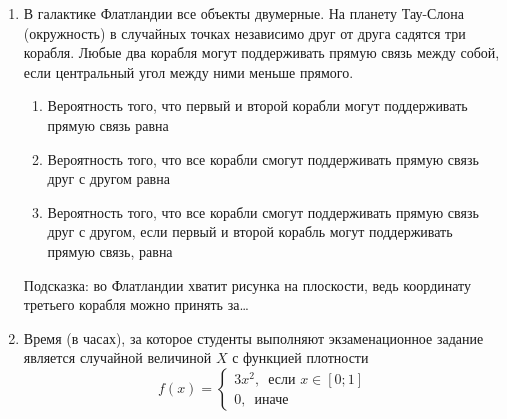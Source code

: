 \begin{enumerate}

\item В галактике Флатландии все объекты двумерные. На планету Тау-Слона (окружность) в случайных точках независимо друг от друга садятся три корабля. Любые два корабля могут поддерживать прямую связь между собой, если центральный угол между ними меньше прямого.

\begin{enumerate}
\item Вероятность того, что первый и второй корабли могут поддерживать прямую связь равна \underline{\hspace{2cm}}
\item Вероятность того, что все корабли смогут поддерживать прямую связь друг с другом равна \underline{\hspace{2cm}}
\item Вероятность того, что все корабли смогут поддерживать прямую связь друг с другом, если первый и второй корабль могут поддерживать прямую связь, равна \underline{\hspace{2cm}}
\end{enumerate}
Подсказка: во Флатландии хватит рисунка на плоскости, ведь координату третьего корабля можно принять за\ldots



\item Время (в часах), за которое студенты выполняют экзаменационное задание является случайной величиной $X$ с функцией плотности
\[
f(x)=\begin{cases}
3x^2, \, \text{ если } x \in [0;1] \\
0, \, \text{ иначе }
\end{cases}
\]


\end{enumerate}
